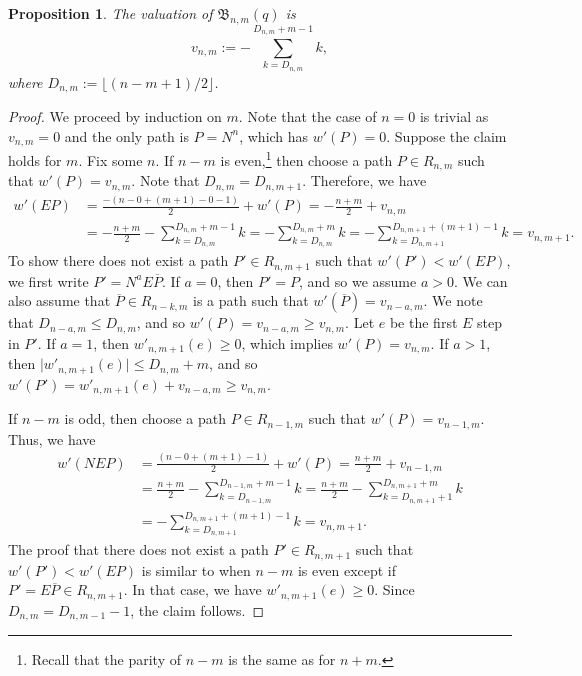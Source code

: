 \documentclass[11pt, leqno]{amsart}
\theoremstyle{plain}
\newtheorem{proposition}[theorem]{Proposition}
\theoremstyle{definition}
\numberwithin{equation}{section}
\newcommand{\seteq}{\mathbin{:=}}
\newcommand{\B}{\mathfrak{B}}
\begin{document}
\begin{proposition}
The valuation of $\B_{n,m}(q)$ is
\[
v_{n,m} \seteq -\sum_{k=D_{n,m}}^{D_{n,m}+m-1} k,
\]
where $D_{n,m} \seteq \lfloor (n-m+1) / 2 \rfloor$.
\end{proposition}

\begin{proof}
We proceed by induction on $m$. Note that the case of $n = 0$ is trivial as $v_{n,m} = 0$ and the only path is $P = N^n$, which has $w'(P) = 0$. Suppose the claim holds for $m$. Fix some $n$. If $n-m$ is even,\footnote{Recall that the parity of $n-m$ is the same as for $n+m$.} then choose a path $P \in R_{n,m}$ such that $w'(P) = v_{n,m}$. Note that $D_{n,m} = D_{n,m+1}$. Therefore, we have
\begin{align*}
w'(EP) & = \frac{-(n-0+(m+1)-0-1)}{2} + w'(P) = -\frac{n+m}{2} + v_{n,m}
\\ & = -\frac{n+m}{2} - \sum_{k=D_{n,m}}^{D_{n,m}+m-1} k = -\sum_{k=D_{n,m}}^{D_{n,m}+m} k = -\sum_{k=D_{n,m+1}}^{D_{n,m+1}+(m+1)-1} k = v_{n,m+1}.
\end{align*}
To show there does not exist a path $P' \in R_{n,m+1}$ such that $w'(P') < w'(EP)$, we first write $P' = N^a E \overline{P}$. If $a = 0$, then $P' = P$, and so we assume $a > 0$. We can also assume that $\overline{P} \in R_{n-k,m}$ is a path such that $w'(\overline{P}) = v_{n-a,m}$. We note that $D_{n-a,m} \leq D_{n,m}$, and so $w'(P) = v_{n-a,m} \geq v_{n,m}$. Let $e$ be the first $E$ step in $P'$. If $a = 1$, then $w'_{n,m+1}(e) \geq 0$, which implies $w'(P) = v_{n,m}$. If $a > 1$, then $\lvert w'_{n,m+1}(e) \rvert \leq D_{n,m} + m$, and so $w'(P') = w'_{n,m+1}(e) + v_{n-a,m} \geq v_{n,m}$.

If $n-m$ is odd, then choose a path $P \in R_{n-1,m}$ such that $w'(P) = v_{n-1,m}$. Thus, we have
\begin{align*}
w'(NEP) & = \frac{(n - 0 + (m+1) - 1)}{2} + w'(P) = \frac{n+m}{2} + v_{n-1,m}
\\ & = \frac{n+m}{2} - \sum_{k=D_{n-1,m}}^{D_{n-1,m}+m-1} k = \frac{n+m}{2} - \sum_{k=D_{n,m+1}+1}^{D_{n,m+1}+m} k
\\ & = -\sum_{k=D_{n,m+1}}^{D_{n,m+1}+(m+1)-1} k = v_{n,m+1}.
\end{align*}
The proof that there does not exist a path $P' \in R_{n,m+1}$ such that $w'(P') < w'(EP)$ is similar to when $n-m$ is even except if $P' = E\overline{P} \in R_{n,m+1}$. In that case, we have $w'_{n,m+1}(e) \geq 0$. Since $D_{n,m} = D_{n,m-1} - 1$, the claim follows.
\end{proof}
\end{document}
